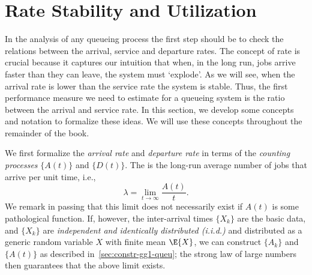 \section{Rate Stability and Utilization}
\label{sec:rate-stability}



In the analysis of any queueing process the first step should be to check the relations between the arrival, service and departure rates.
The concept of rate is crucial because it captures our intuition that when, in the long run, jobs arrive faster than they can leave, the system must `explode'.
As we will see, when the arrival rate is lower than the service rate the system is stable.
Thus, the first performance measure we need to estimate for a queueing system is the ratio between the arrival and service rate.
In this section, we develop some concepts and notation to formalize these ideas.
We will use these concepts throughout the remainder of the book.

We first formalize the \emph{arrival rate} and \emph{departure rate} in terms of the \emph{counting processes} $\{A(t)\}$ and $\{D(t)\}$.
The  is the long-run average number of jobs that arrive per unit time, i.e.,
\begin{equation}
 \label{eq:3}
 \lambda = \lim_{t\to\infty} \frac{A(t)}t.
\end{equation}
We remark in passing that this limit does not necessarily exist if $A(t)$ is some pathological function.
If, however, the inter-arrival times $\{X_k\}$ are the basic data, and $\{X_k\}$ are \emph{independent and identically distributed (i.i.d.)}
and distributed as a generic random variable $X$ with finite mean $\E{X}$, we can construct $\{A_k\}$ and $\{A(t)\}$ as described in~\cref{sec:constr-gg1-queu}; the strong law of large numbers then guarantees that the above limit exists.

